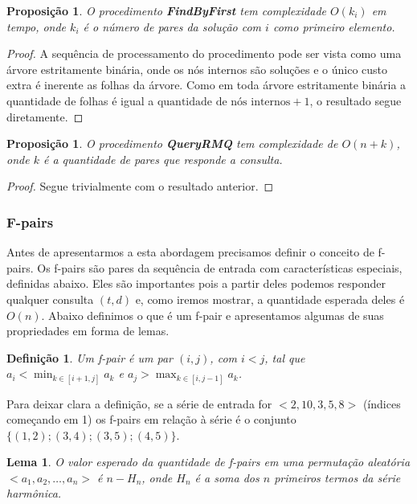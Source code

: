 \documentclass[12pt]{article}
\newtheorem{lem}[thm]{Lema}
\newtheorem{prop}[thm]{Proposição}
\newtheorem{defi}[thm]{Definição}
\begin{document}
\begin{prop}
O procedimento {\bf FindByFirst} tem complexidade $O(k_i)$ em tempo,
onde $k_i$ é o número de pares da solução com $i$ como primeiro elemento.
\end{prop}  
\begin{proof}
A sequência de processamento do procedimento pode ser vista
como uma árvore estritamente binária, onde os nós internos são soluções e o único
custo extra é inerente as folhas da árvore. Como em toda
árvore estritamente binária a quantidade de folhas é igual a $\text{quantidade de nós internos} + 1$,
o resultado segue diretamente.
\end{proof} 

\begin{prop}
O procedimento {\bf QueryRMQ} tem complexidade de $O(n + k)$,
onde $k$ é a quantidade de pares que responde a consulta.
\end{prop}

\begin{proof}
Segue trivialmente com o resultado anterior.
\end{proof} 

\subsubsection{F-pairs}

Antes de apresentarmos a esta abordagem precisamos definir 
o conceito de f-pairs. Os f-pairs são pares da sequência de entrada
com características especiais, definidas abaixo. Eles são importantes pois
a partir deles podemos responder qualquer consulta $(t, d)$ e,
como iremos mostrar, a quantidade esperada deles é $O(n)$. 
Abaixo definimos o que é um f-pair e apresentamos algumas de suas propriedades
em forma de lemas.

\begin{defi}
Um f-pair é um par $(i, j)$, com $i < j$, tal que $a_i < \min_{k \in [i + 1, j]} a_k$ e $a_j > \max_{k \in [i, j -1]} a_k$.
\end{defi}
Para deixar clara a definição, se a série de entrada for $<2, 10, 3, 5, 8>$ (índices começando em 1) os f-pairs
em relação à série é o conjunto $\{(1, 2); (3, 4); (3, 5); (4, 5) \}$. 

\begin{lem}
O valor esperado da quantidade de f-pairs em uma
permutação aleatória $<a_1, a_2, \ldots, a_n>$ é $n - H_n$, onde
$H_n$ é a soma dos $n$ primeiros termos da série harmônica.
\label{amountf}
\end{lem}
\end{document}

